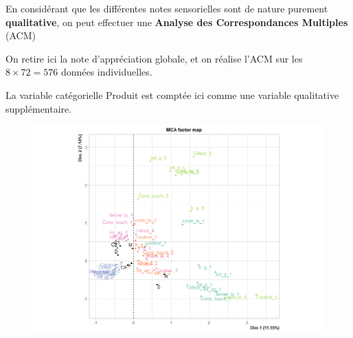 \documentclass[aspectratio=169,xcolor=dvipsnames]{beamer}
\begin{document}
\begin{frame}

\textcolor{nyubluedarker}{\faCogs} En considérant que les différentes notes sensorielles sont de nature purement \textbf{qualitative}, on peut effectuer une \textbf{Analyse des Correspondances Multiples} (ACM)

\medskip

\textcolor{nyubluedarker}{\faCogs} On retire ici la note d'appréciation globale, et on réalise l'ACM sur les $8\times 72 = 576$ données individuelles.

\medskip

\textcolor{nyubluedarker}{\faCogs} La variable catégorielle \og Produit \fg{}  est comptée ici comme une variable qualitative supplémentaire.

\begin{figure}
\centering
\includegraphics[scale=0.2]{mca_na.png}
\end{figure}

\end{frame}
\end{document}
